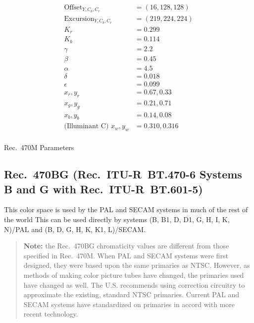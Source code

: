 \documentclass[9pt,letterpaper]{book}
\numberwithin{equation}{chapter}
\numberwithin{figure}{chapter}
\numberwithin{table}{chapter}
\begin{document}
\begin{table}[htb]
\begin{align*}
\mathrm{Offset}_{Y,C_b,C_r}    & = (16, 128, 128)  \\
\mathrm{Excursion}_{Y,C_b,C_r} & = (219, 224, 224) \\
K_r                            & = 0.299           \\
K_b                            & = 0.114           \\
\gamma                         & = 2.2             \\
\beta                          & = 0.45            \\
\alpha                         & = 4.5             \\
\delta                         & = 0.018           \\
\epsilon                       & = 0.099           \\
x_r,y_r                        & = 0.67, 0.33      \\
x_g,y_g                        & = 0.21, 0.71      \\
x_b,y_b                        & = 0.14, 0.08      \\
\text{(Illuminant C) } x_w,y_w & = 0.310, 0.316    \\
\end{align*}
\caption{Rec.~470M Parameters}
\label{tab:470m}
\end{table}

\subsection{Rec.~470BG (Rec.~ITU-R~BT.470-6 Systems B and G with
 Rec.~ITU-R~BT.601-5)}
\label{sec:470bg}

This color space is used by the PAL and SECAM systems in much of the rest of
 the world \cite{rec470}
This can be used directly by systems (B, B1, D, D1, G, H, I, K, N)/PAL and (B,
 D, G, H, K, K1, L)/SECAM\@.

\begin{verse}
{\bf Note:} the Rec.~470BG chromaticity values are different from those
 specified in Rec.~470M\@.
When PAL and SECAM systems were first designed, they were based upon the same
 primaries as NTSC\@.
However, as methods of making color picture tubes have changed, the primaries
 used have changed as well.
The U.S. recommends using correction circuitry to approximate the existing,
 standard NTSC primaries.
Current PAL and SECAM systems have standardized on primaries in accord with
 more recent technology.
\end{verse}
\end{document}
